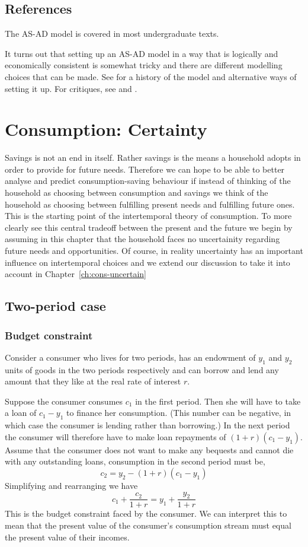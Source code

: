 \documentclass[11pt,reqno,openany]{amsbook}
\begin{document}
\section*{References}
The AS-AD model is covered in most undergraduate texts.

It turns out that setting up an AS-AD model in a way that is
logically and economically consistent is somewhat tricky and
there are different modelling choices that can be made. See
\cite{dutt2002aggregate} for a history of the model and
alternative ways of setting it up. For critiques, see
\cite{barro1994aggregate} and \cite{colander1995stories}.
\chapter{Consumption: Certainty}
Savings is not an end in itself. Rather savings is the means
a household adopts in order to provide for future
needs. Therefore we can hope to be able to better analyse
and predict consumption-saving behaviour if instead of
thinking of the household as choosing between consumption
and savings we think of the household as choosing between
fulfilling present needs and fulfilling future ones. This is
the starting point of the intertemporal theory of
consumption. To more clearly see this central tradeoff
between the present and the future we begin by assuming in
this chapter that the household faces no uncertainity
regarding future needs and opportunities. Of course, in
reality uncertainty has an important influence on
intertemporal choices and we extend our discussion to take
it into account in Chapter~\ref{ch:cons-uncertain}
\section{Two-period case}
\subsection{Budget constraint}
Consider a consumer who lives for two periods, has an
endowment of $y_1$ and $y_2$ units of goods in the two
periods respectively and can borrow and lend any amount that
they like at the real rate of interest $r$.

Suppose the consumer consumes $c_1$ in the first
period. Then she will have to take a loan of $c_1-y_1$ to
finance her consumption. (This number can be negative, in
which case the consumer is lending rather than borrowing.)
In the next period the consumer will therefore have to make
loan repayments of $(1+r)(c_1-y_1)$. Assume that the
consumer does not want to make any bequests and cannot die
with any outstanding loans, consumption in the second period
must be,
\[c_2=y_2-(1+r)(c_1-y_1)\]
Simplifying and rearranging we have
\begin{equation}\label{eq:two-period-budget}
c_1+\frac{c_2}{1+r}=y_1+\frac{y_2}{1+r}
\end{equation}
This is the budget constraint faced by the consumer. We can
interpret this to mean that the present value of the
consumer's consumption stream must equal the present value
of their incomes.
\end{document}
